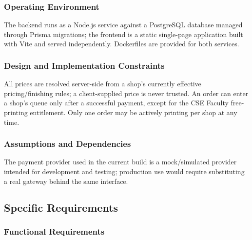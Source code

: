 \documentclass[12pt,a4paper]{report}
\begin{document}
\subsubsection*{Operating Environment}
The backend runs as a Node.js service against a PostgreSQL database managed through Prisma migrations; the frontend is a static single-page application built with Vite and served independently. Dockerfiles are provided for both services.

\subsubsection*{Design and Implementation Constraints}
All prices are resolved server-side from a shop's currently effective pricing/finishing rules; a client-supplied price is never trusted. An order can enter a shop's queue only after a successful payment, except for the CSE Faculty free-printing entitlement. Only one order may be actively printing per shop at any time.

\subsubsection*{Assumptions and Dependencies}
The payment provider used in the current build is a mock/simulated provider intended for development and testing; production use would require substituting a real gateway behind the same interface.

\subsection{Specific Requirements}

\subsubsection*{Functional Requirements}
\end{document}
